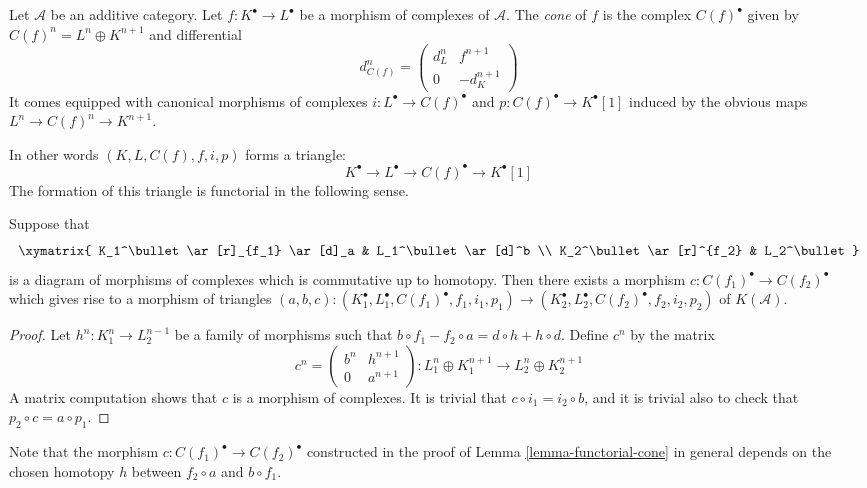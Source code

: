 \begin{definition}
\label{definition-cone}
Let $\mathcal{A}$ be an additive category.
Let $f : K^\bullet \to L^\bullet$ be a morphism of
complexes of $\mathcal{A}$. The {\it cone} of $f$
is the complex $C(f)^\bullet$ given by
$C(f)^n = L^n \oplus K^{n + 1}$ and
differential
$$
d_{C(f)}^n =
\left(
\begin{matrix}
d^n_L & f^{n + 1} \\
0 & -d_K^{n + 1}
\end{matrix}
\right)
$$
It comes equipped with canonical morphisms of complexes
$i : L^\bullet \to C(f)^\bullet$ and $p : C(f)^\bullet \to K^\bullet[1]$
induced by the obvious maps $L^n \to C(f)^n \to K^{n + 1}$.
\end{definition}

\noindent
In other words $(K, L, C(f), f, i, p)$ forms a triangle:
$$
K^\bullet \to L^\bullet \to C(f)^\bullet \to K^\bullet[1]
$$
The formation of this triangle is
functorial in the following sense.

\begin{lemma}
\label{lemma-functorial-cone}
Suppose that
$$
\xymatrix{
K_1^\bullet \ar[r]_{f_1} \ar[d]_a & L_1^\bullet \ar[d]^b \\
K_2^\bullet \ar[r]^{f_2} & L_2^\bullet
}
$$
is a diagram of morphisms of complexes which is commutative
up to homotopy. Then there exists a morphism
$c : C(f_1)^\bullet \to C(f_2)^\bullet$ which gives rise to
a morphism of triangles
$(a, b, c) : (K_1^\bullet, L_1^\bullet, C(f_1)^\bullet, f_1, i_1, p_1)
\to
(K_2^\bullet, L_2^\bullet, C(f_2)^\bullet, f_2, i_2, p_2)$
of $K(\mathcal{A})$.
\end{lemma}

\begin{proof}
Let $h^n : K_1^n \to L_2^{n - 1}$ be a family of morphisms such that
$b \circ f_1 - f_2 \circ a= d \circ h + h \circ d$.
Define $c^n$ by the matrix
$$
c^n =
\left(
\begin{matrix}
b^n & h^{n + 1} \\
0 & a^{n + 1}
\end{matrix}
\right) :
L_1^n \oplus K_1^{n + 1} \to L_2^n \oplus K_2^{n + 1}
$$
A matrix computation shows that $c$ is a morphism of complexes.
It is trivial that $c \circ i_1 = i_2 \circ b$, and it is
trivial also to check that $p_2 \circ c = a \circ p_1$.
\end{proof}

\noindent
Note that the morphism $c : C(f_1)^\bullet \to C(f_2)^\bullet$
constructed in the
proof of Lemma \ref{lemma-functorial-cone} in general depends on the
chosen homotopy $h$ between $f_2 \circ a$ and $b \circ f_1$.

